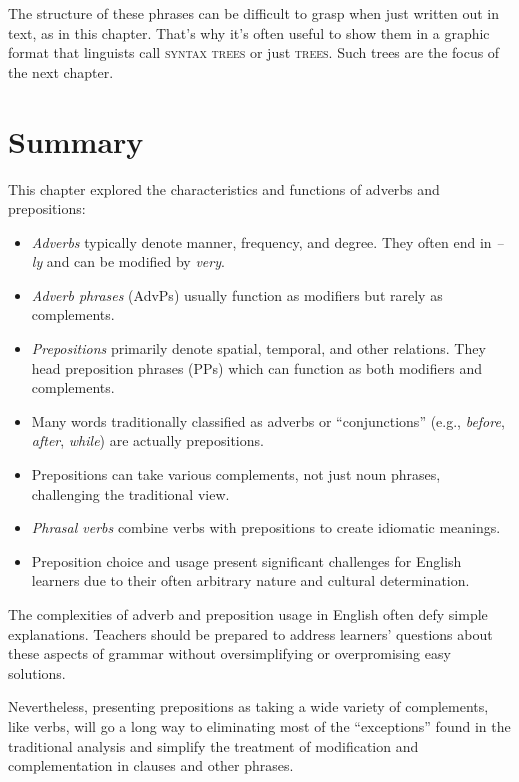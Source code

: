 The structure of these phrases can be difficult to grasp when just written out in text, as in this chapter. That's why it's often useful to show them in a graphic format that linguists call \textsc{syntax trees} or just \textsc{trees}. Such trees are the focus of the next chapter.

\section{Summary}

This chapter explored the characteristics and functions of adverbs and prepositions:

\begin{itemize}
    \item \textit{Adverbs} typically denote manner, frequency, and degree. They often end in \textit{--ly} and can be modified by \textit{very}.
    \item \textit{Adverb phrases} (AdvPs) usually function as modifiers but rarely as complements.
    \item \textit{Prepositions} primarily denote spatial, temporal, and other relations. They head preposition phrases (PPs) which can function as both modifiers and complements.
    \item Many words traditionally classified as adverbs or ``conjunctions'' (e.g., \textit{before}, \textit{after}, \textit{while}) are actually prepositions.
    \item Prepositions can take various complements, not just noun phrases, challenging the traditional view.
    \item \textit{Phrasal verbs} combine verbs with prepositions to create idiomatic meanings.
    \item Preposition choice and usage present significant challenges for English learners due to their often arbitrary nature and cultural determination.
\end{itemize}

The complexities of adverb and preposition usage in English often defy simple explanations. Teachers should be prepared to address learners' questions about these aspects of grammar without oversimplifying or overpromising easy solutions.

Nevertheless, presenting prepositions as taking a wide variety of complements, like verbs, will go a long way to eliminating most of the ``exceptions'' found in the traditional analysis and simplify the treatment of modification and complementation in clauses and other phrases.

